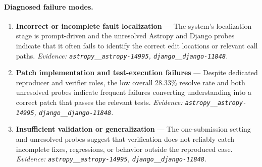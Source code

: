 \paragraph{Diagnosed failure modes.}\begin{enumerate}\itemsep1pt
\item \textbf{Incorrect or incomplete fault localization} --- The system's localization stage is prompt-driven and the unresolved Astropy and Django probes indicate that it often fails to identify the correct edit locations or relevant call paths. \emph{Evidence: \texttt{astropy\_\_astropy-14995}, \texttt{django\_\_django-11848}.}
\item \textbf{Patch implementation and test-execution failures} --- Despite dedicated reproducer and verifier roles, the low overall 28.33\% resolve rate and both unresolved probes indicate frequent failures converting understanding into a correct patch that passes the relevant tests. \emph{Evidence: \texttt{astropy\_\_astropy-14995}, \texttt{django\_\_django-11848}.}
\item \textbf{Insufficient validation or generalization} --- The one-submission setting and unresolved probes suggest that verification does not reliably catch incomplete fixes, regressions, or behavior outside the reproduced case. \emph{Evidence: \texttt{astropy\_\_astropy-14995}, \texttt{django\_\_django-11848}.}
\end{enumerate}
